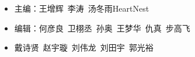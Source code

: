 \begin{titlepage}
\begin{itemize}
\item[] 主\qquad 编：王增辉\, 李\quad 涛\, 汤冬雨\hspace{0.3cm}HeartNest
\item[] 编\qquad 辑：何彦良\, 卫栩丞\, 孙\quad 奥\, 王梦华\, 仇\quad 真\, 步高飞
\item[] \hspace*{2.1cm}戴诗贤\, 赵宇璇\, 刘伟龙\, 刘田宇\, 郭光裕


\end{itemize}



\clearpage{\pagestyle{empty}\cleardoublepage}%
\end{titlepage}


\clearpage{\pagestyle{empty}\cleardoublepage}

{
\hypersetup{linkcolor=black}
\tableofcontents                        %

}
\clearpage{\pagestyle{empty}\cleardoublepage}
